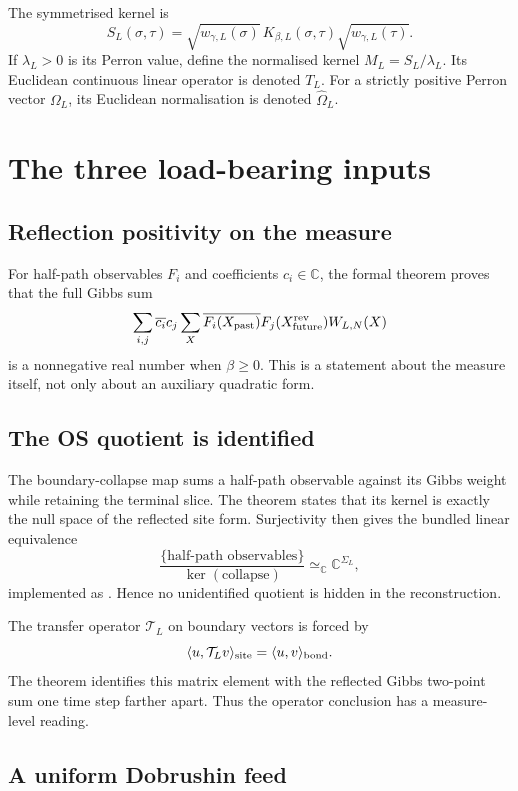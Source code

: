 \documentclass[11pt]{article}
\newcommand{\CC}{\mathbb{C}}
\newcommand{\ip}[2]{\langle #1,#2\rangle}
\begin{document}
The symmetrised kernel is
\[
 S_L(\sigma,\tau)=
 \sqrt{w_{\gamma,L}(\sigma)}\,K_{\beta,L}(\sigma,\tau)
 \sqrt{w_{\gamma,L}(\tau)}.
\]
If $\lambda_L>0$ is its Perron value, define the normalised kernel
$M_L=S_L/\lambda_L$.  Its Euclidean continuous linear operator is denoted
$T_L$.  For a strictly positive Perron vector $\Omega_L$, its Euclidean
normalisation is denoted $\widehat\Omega_L$.

\section{The three load-bearing inputs}

\subsection{Reflection positivity on the measure}

For half-path observables $F_i$ and coefficients $c_i\in\CC$, the formal
theorem  proves that the full Gibbs
sum
\[
 \sum_{i,j}\overline{c_i}c_j
 \sum_X \overline{F_i(X_{\rm past})}F_j(X_{\rm future}^{\rm rev})W_{L,N}(X)
\]
is a nonnegative real number when $\beta\geq0$.  This is a statement about the
measure itself, not only about an auxiliary quadratic form.

\subsection{The OS quotient is identified}

The boundary-collapse map sums a half-path observable against its Gibbs
weight while retaining the terminal slice.  The theorem
 states that its kernel is exactly the
null space of the reflected site form.  Surjectivity then gives the bundled
linear equivalence
\[
  \frac{\{\text{half-path observables}\}}
       {\ker(\text{collapse})}
  \simeq_{\CC} \CC^{\Sigma_L},
\]
implemented as . Hence no unidentified quotient
is hidden in the reconstruction.

The transfer operator $\mathcal T_L$ on boundary vectors is forced by
\[
 \ip{u}{\mathcal T_Lv}_{\rm site}=\ip{u}{v}_{\rm bond}.
\]
The theorem  identifies this
matrix element with the reflected Gibbs two-point sum one time step farther
apart.  Thus the operator conclusion has a measure-level reading.

\subsection{A uniform Dobrushin feed}
\end{document}
